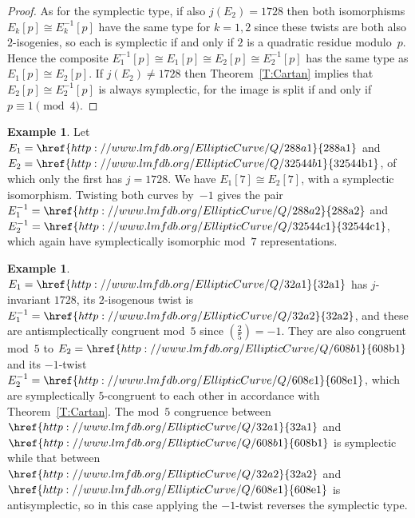 \documentclass[12pt]{amsart}
\newcommand{\lmfdbec}[3]{\href{http://www.lmfdb.org/EllipticCurve/Q/#1#2#3}{{\text{\rm#1#2#3}}}}
\def\legendre#1#2{\left(\displaystyle\frac{#1}{#2}\right)}
\numberwithin{equation}{section}
\theoremstyle{definition}
\newtheorem{example}[theorem]{Example}
\theoremstyle{remark}
\begin{document}
\begin{proof}
As for the symplectic type, if also $j(E_2)=1728$ then both
isomorphisms $E_k[p]\cong E_k^{-1}[p]$ have the same type for $k=1,2$
since these twists are both also $2$-isogenies, so each is symplectic
if and only if $2$ is a quadratic residue modulo~$p$.  Hence the
composite $E_1^{-1}[p]\cong E_1[p]\cong E_2[p]\cong E_2^{-1}[p]$ has
the same type as $E_1[p]\cong E_2[p]$.  If $j(E_2)\not=1728$ then
Theorem~\ref{T:Cartan} implies that $E_2[p]\cong E_2^{-1}[p]$ is
always symplectic, for the image is split if and only
if~$p\equiv1\pmod4$.
\end{proof}

\begin{example}
Let $E_1=\lmfdbec{288}{a}{1}$ and $E_2=\lmfdbec{32544}{b}{1}$, of
which only the first has $j=1728$.  We have $E_1[7]\cong E_2[7]$, with
a symplectic isomorphism.  Twisting both curves by~$-1$ gives the pair
$E_1^{-1}=\lmfdbec{288}{a}{2}$ and $E_2^{-1}=\lmfdbec{32544}{c}{1}$,
which again have symplectically isomorphic mod~$7$ representations.
\end{example}

\begin{example}
  $E_1=\lmfdbec{32}{a}{1}$ has $j$-invariant $1728$, its $2$-isogenous
  twist is $E_1^{-1}=\lmfdbec{32}{a}{2}$, and these are
  antismplectically congruent mod~$5$ since $\legendre{2}{5}=-1$.
  They are also congruent mod~$5$ to $E_2=\lmfdbec{608}{b}{1}$ and its
  $-1$-twist $E_2^{-1}=\lmfdbec{608}{e}{1}$, which are symplectically
  $5$-congruent to each other in accordance with
  Theorem~\ref{T:Cartan}.  The mod~$5$ congruence between
  $\lmfdbec{32}{a}{1}$ and $\lmfdbec{608}{b}{1}$ is symplectic while
  that between $\lmfdbec{32}{a}{2}$ and $\lmfdbec{608}{e}{1}$ is
  antisymplectic, so in this case applying the $-1$-twist reverses the
  symplectic type.
\end{example}
\end{document}
